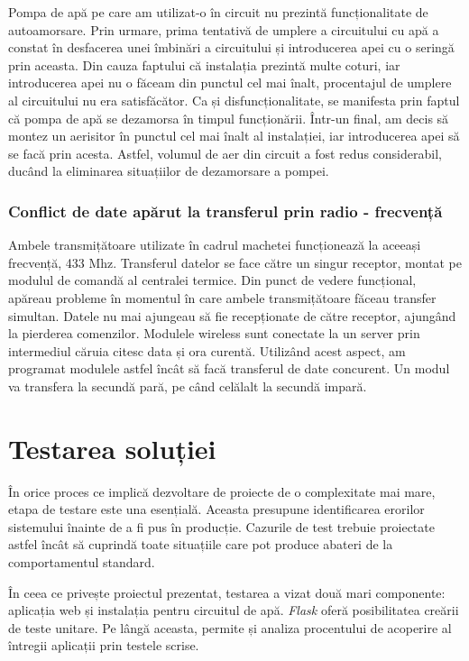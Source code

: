 	Pompa de apă pe care am utilizat-o în circuit nu prezintă funcționalitate de autoamorsare. Prin urmare, prima tentativă de umplere a circuitului cu apă a constat în desfacerea unei îmbinări a circuitului și introducerea apei cu o seringă prin aceasta. Din cauza faptului că instalația prezintă multe coturi, iar introducerea apei nu o făceam din punctul cel mai înalt, procentajul de umplere al circuitului nu era satisfăcător. Ca și disfuncționalitate, se manifesta prin faptul că pompa de apă se dezamorsa în timpul funcționării. Într-un final, am decis să montez un aerisitor în punctul cel mai înalt al instalației, iar introducerea apei să se facă prin acesta. Astfel, volumul de aer din circuit a fost redus considerabil, ducând la eliminarea situațiilor de dezamorsare a pompei.

\subsubsection{Conflict de date apărut la transferul prin radio - frecvență}

	Ambele transmițătoare utilizate în cadrul machetei funcționează la aceeași frecvență, 433 Mhz. Transferul datelor se face către un singur receptor, montat pe modulul de comandă al centralei termice. Din punct de vedere funcțional, apăreau probleme în momentul în care ambele transmițătoare făceau transfer simultan. Datele nu mai ajungeau să fie recepționate de către receptor, ajungând la pierderea comenzilor. Modulele wireless sunt conectate la un server prin intermediul căruia citesc data și ora curentă. Utilizând acest aspect, am programat modulele astfel încât să facă transferul de date concurent. Un modul va transfera la secundă pară, pe când celălalt la secundă impară. 

\section{Testarea soluției}

	În orice proces ce implică dezvoltare de proiecte de o complexitate mai mare, etapa de testare este una esențială. Aceasta presupune identificarea erorilor sistemului înainte de a fi pus în producție. Cazurile de test trebuie proiectate astfel încât să cuprindă toate situațiile care pot produce abateri de la comportamentul standard. 

	În ceea ce privește proiectul prezentat, testarea a vizat două mari componente: aplicația web și instalația pentru circuitul de apă. \textit{Flask} oferă posibilitatea creării de teste unitare. Pe lângă aceasta, permite și analiza procentului de acoperire al întregii aplicații prin testele scrise.

